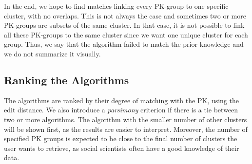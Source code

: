 

In the end, we hope to find matches linking every PK-group to one specific cluster, with no overlaps. This is not always the case and sometimes two or more PK-groups are subsets of the same cluster. In that case, it is not possible to link all these PK-groups to the same cluster since we want one unique cluster for each group. Thus, we say that the algorithm failed to match the prior knowledge and we do not summarize it visually.




\subsection{Ranking the Algorithms}

The algorithms are ranked by their degree of matching with the PK, using the edit distance. We also introduce a \emph{parsimony} criterion if there is a tie between two or more algorithms. The algorithm with the smaller number of other clusters will be shown first, as the results are easier to interpret. Moreover, the number of specified PK groups is expected to be close to the final number of clusters the user wants to retrieve, as social scientists often have a good knowledge of their data.

